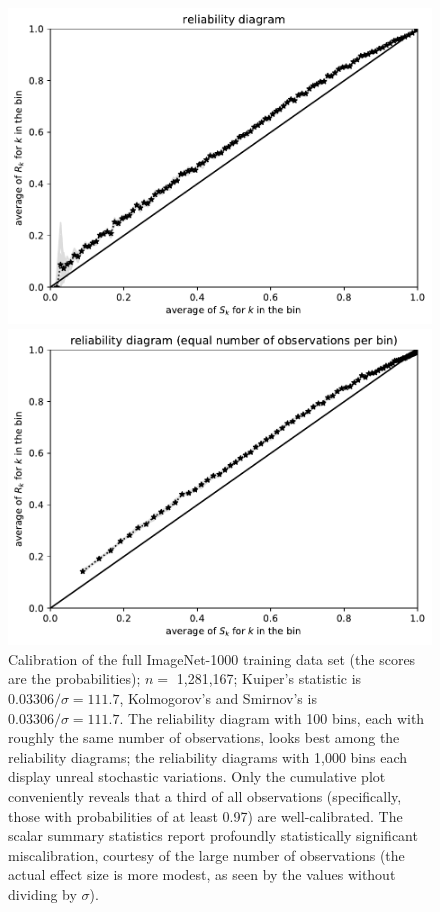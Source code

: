 \documentclass{article}
\begin{document}
\begin{figure}
\begin{centering}
\parbox{\imsize}{\includegraphics[width=\imsize]
                {./codes/unweighted/fullequiprob100}}
\quad\quad
\parbox{\imsize}{\includegraphics[width=\imsize]
                {./codes/unweighted/fullequisamp100}}

\end{centering}
\caption{Calibration of the full ImageNet-1000 training data set
         (the scores are the probabilities); $n =$ 1,281,167;
         Kuiper's statistic is $0.03306 / \sigma = 111.7$,
         Kolmogorov's and Smirnov's is $0.03306 / \sigma = 111.7$.
The reliability diagram with 100 bins,
each with roughly the same number of observations, looks best
among the reliability diagrams; the reliability diagrams with 1,000 bins each
display unreal stochastic variations.
Only the cumulative plot conveniently reveals that a third of all observations
(specifically, those with probabilities of at least 0.97) are well-calibrated.
The scalar summary statistics report
profoundly statistically significant miscalibration,
courtesy of the large number of observations
(the actual effect size is more modest, as seen by the values
without dividing by $\sigma$).
}
\label{imagenetcal}
\end{figure}
\end{document}
